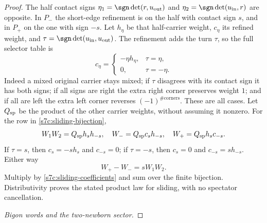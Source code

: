 \begin{proof}
The half contact signs
$\eta_1=\sgn\det(r,u_{\rm out})$ and
$\eta_2=\sgn\det(u_{\rm in},r)$ are opposite.  In $P_-$ the
short-edge refinement is on the half with contact sign $s$, and in $P_+$
on the one with sign $-s$.  Let $h_\eta$ be that half-carrier weight,
$c_\eta$ its refined weight, and
$\tau=\sgn\det(u_{\rm in},u_{\rm out})$.  The refinement adds
the turn $\tau$, so the full selector table is
\begin{equation}\label{s7c:short-selector}
 c_\eta=\begin{cases}
 -\eta h_\eta,&\tau=\eta,\\
 0,&\tau=-\eta.
 \end{cases}
\end{equation}
Indeed a mixed original carrier stays mixed; if $\tau$ disagrees with
its contact sign it has both signs; if all signs are right the extra
right corner preserves weight $1$; and if all are left the extra left
corner reverses $(-1)^{\#\text{corners}}$.  These are all cases.
Let $Q_{\rm sp}$ be the product of the other carrier weights, without
assuming it nonzero.  For the row in \eqref{s7c:sliding-bijection},
\begin{equation}\label{s7c:sliding-selector-factors}
 W_1W_2=Q_{\rm sp}h_s h_{-s},\quad
 W_-=Q_{\rm sp}c_s h_{-s},\quad
 W_+=Q_{\rm sp}h_s c_{-s}.
\end{equation}
If $\tau=s$, then $c_s=-s h_s$ and $c_{-s}=0$; if $\tau=-s$,
then $c_s=0$ and $c_{-s}=s h_{-s}$.  Either way
\begin{equation}\label{s7c:sliding-selector-difference}
 W_+-W_-=sW_1W_2.
\end{equation}
Multiply by \eqref{s7c:sliding-coefficients} and sum over the finite
bijection.  Distributivity proves the stated product law for sliding,
with no spectator cancellation.

\par\medskip\noindent\emph{Bigon words and the two-newborn sector.}\par


\end{proof}
